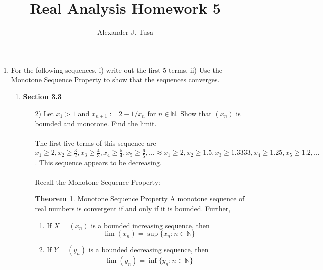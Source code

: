 \documentclass[12pt,letterpaper]{article}
\author{Alexander J. Tusa}
\title{Real Analysis Homework 5}
\newcommand{\N}{\mathbb{N}}
\theoremstyle{case}
\theoremstyle{definition}
\newtheorem*{theorem*}{Theorem}
\begin{document}
	\maketitle
	\begin{enumerate}
	\item For the following sequences, i) write out the first 5 terms, ii) Use the Monotone Sequence Property to show that the sequences converges.
	\begin{enumerate}
		\item \textbf{Section 3.3}
		\begin{enumerate}
			\item[2)] Let $x_1 > 1$ and $x_{n+1} := 2-1/x_n$ for $n \in \N$. Show that $(x_n)$ is bounded and monotone. Find the limit.
			\\\\ The first five terms of this sequence are $x_1 \geq 2,x_2 \geq \frac{3}{2}, x_3 \geq \frac{4}{3}, x_4 \geq \frac{5}{4}, x_5 \geq \frac{6}{5}, \dots \approx x_1 \ge 2, x_2 \geq 1.5, x_3 \geq 1.3333, x_4 \geq 1.25, x_5 \geq 1.2, \dots$. This sequence appears to be decreasing.
			\\\\Recall the Monotone Sequence Property:
			\begin{theorem*}{Monotone Sequence Property}
				A monotone sequence of real numbers is convergent if and only if it is bounded. Further,
				\begin{enumerate}
					\item If $X=(x_n)$ is a bounded increasing sequence, then
					\[\lim (x_n) = \sup \{x_n:n \in \N\}\]
					
					\item If $Y=(y_n)$ is a bounded decreasing sequence, then
					\[\lim (y_n) = \inf \{y_n : n \in \N \}\]
				\end{enumerate}
			\end{theorem*}
		

\end{enumerate}
\end{enumerate}
\end{enumerate}
\end{document}
